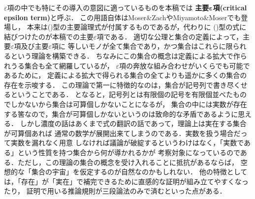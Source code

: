 	$\varepsilon$項の中でも特にその導入の意図に適っているものを本稿では
	{\bf 主要${\boldsymbol \varepsilon}$項}{\bf (critical epsilon term)}と呼ぶ．
	この用語自体はMoser$\&$Zach\cite{Moser_Zach}やMiyamoto$\&$Moser\cite{Miyamoto_Moser}でも登場し，
	本来は()型の主要論理式が付属するものであるが，代わりに
	()型の式に結びつけたのが本稿での主要$\varepsilon$項である．
	適切な公理と集合の定義によって，主要$\varepsilon$項及び主要$\varepsilon$項に
	等しいモノが全て集合であり，かつ集合はこれらに限られるという理論を構築できる．
	ちなみにこの集合の概念は定義による拡大で作られうる集合も全て網羅しているが，
	$\varepsilon$項の奔放な組み合わせがいくらでも可能であるために，
	定義による拡大で得られる集合の全てよりも遥かに多くの集合の存在を示唆する．
	この理論で第一に特徴的なのは，集合が記号列で書き尽くせるということである．
	となると，記号列とは有限個の記号を有限個並べたものでしかないから集合は可算個しかないことになるが，
	集合の中には実数が存在する筈なので，集合が可算個しかないというのは致命的な矛盾であるように思える．
	しかし濃度の話はあくまで式の翻訳の話であって，理論上は実在する集合が可算個あれば
	通常の数学が展開出来てしまうのである．実数を扱う場合だって実数を漏れなく用意
	しなければ議論が破綻するというわけはなく，「実数である」という性質を持つ集合から何が導かれるかが
	考察対象になっているのである．ただし，この理論の集合の概念を受け入れることに抵抗があるならば，
	空想的な「集合の宇宙」を仮定するのが自然なのかもしれない．
	他の特徴としては，「存在」が「実在」で補完できるために直感的な証明が組み立てやすくなったり，
	証明で用いる推論規則が三段論法のみで済むといった点がある．
	
